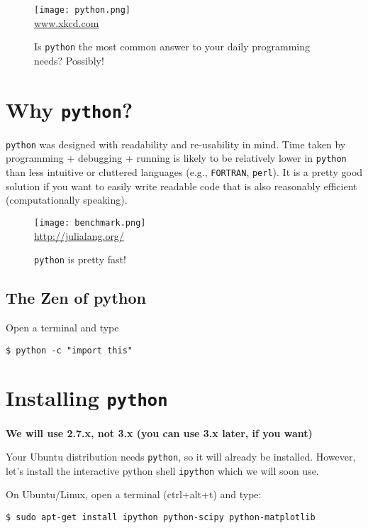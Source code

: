 \begin{figure} \centering
	    \texttt{[image: python.png]}\\
		\url{www.xkcd.com}
	\caption{Is {\tt python} the most common answer to your daily 
	programming needs? Possibly!}
\end{figure}

\section{Why {\tt python}?}

{\tt python} was designed with readability and re-usability in mind. 
Time taken by programming + debugging + running is likely to be 
relatively lower in {\tt python} than less intuitive or cluttered 
languages (e.g., {\tt FORTRAN}, {\tt perl}). It is a pretty good 
solution if you want to  easily write readable code that is also 
reasonably efficient (computationally speaking).

\begin{figure}
	\begin{center}
    \texttt{[image: benchmark.png]}\\
		\url{http://julialang.org/}
	\end{center}
	\caption{{\tt python} is pretty fast!}
\end{figure}

\subsection{The Zen of python}
Open a terminal and type
\begin{lstlisting}
$ python -c "import this"
\end{lstlisting}

\section{Installing {\tt python}}

{\bf We will use 2.7.x, not 3.x (you can use 3.x later, if you want)}

Your Ubuntu distribution needs {\tt python}, so it will already be installed. 
However, let's install the interactive python shell {\tt ipython} which 
we will soon use.   
\begin{compactitem}[$\quad\star$]\itemsep4pt
\item On Ubuntu/Linux, open a terminal (ctrl+alt+t) and type:
\begin{lstlisting}
$ sudo apt-get install ipython python-scipy python-matplotlib
\end{lstlisting}
\end{compactitem}

